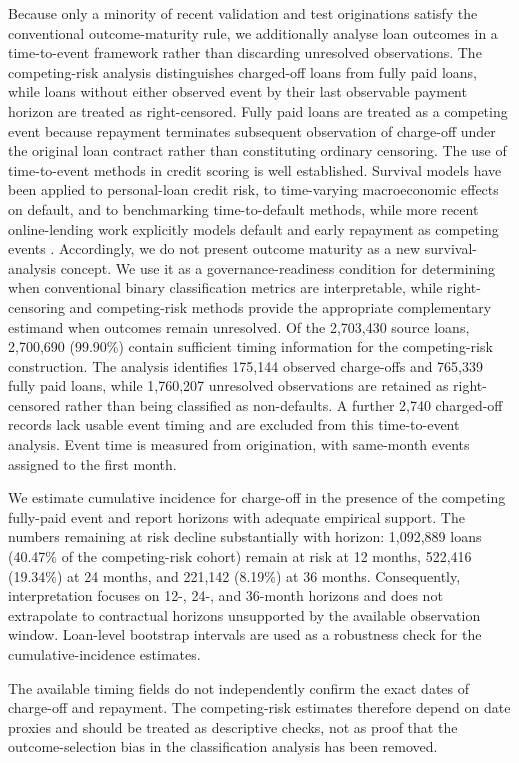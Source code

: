 \documentclass[10pt]{article}
\begin{document}
Because only a minority of recent validation and test originations satisfy the conventional outcome-maturity rule, we additionally analyse loan outcomes in a time-to-event framework rather than discarding unresolved observations. The competing-risk analysis distinguishes charged-off loans from fully paid loans, while loans without either observed event by their last observable payment horizon are treated as right-censored. Fully paid loans are treated as a competing event because repayment terminates subsequent observation of charge-off under the original loan contract rather than constituting ordinary censoring. The use of time-to-event methods in credit scoring is well established. Survival models have been applied to personal-loan credit risk, to time-varying macroeconomic effects on default, and to benchmarking time-to-default methods, while more recent online-lending work explicitly models default and early repayment as competing events \cite{ref49,ref50,ref51,ref52}. Accordingly, we do not present outcome maturity as a new survival-analysis concept. We use it as a governance-readiness condition for determining when conventional binary classification metrics are interpretable, while right-censoring and competing-risk methods provide the appropriate complementary estimand when outcomes remain unresolved. Of the 2,703,430 source loans, 2,700,690 (99.90\%) contain sufficient timing information for the competing-risk construction. The analysis identifies 175,144 observed charge-offs and 765,339 fully paid loans, while 1,760,207 unresolved observations are retained as right-censored rather than being classified as non-defaults. A further 2,740 charged-off records lack usable event timing and are excluded from this time-to-event analysis. Event time is measured from origination, with same-month events assigned to the first month.

We estimate cumulative incidence for charge-off in the presence of the competing fully-paid event and report horizons with adequate empirical support. The numbers remaining at risk decline substantially with horizon: 1,092,889 loans (40.47\% of the competing-risk cohort) remain at risk at 12 months, 522,416 (19.34\%) at 24 months, and 221,142 (8.19\%) at 36 months. Consequently, interpretation focuses on 12-, 24-, and 36-month horizons and does not extrapolate to contractual horizons unsupported by the available observation window. Loan-level bootstrap intervals are used as a robustness check for the cumulative-incidence estimates.

The available timing fields do not independently confirm the exact dates of charge-off and repayment. The competing-risk estimates therefore depend on date proxies and should be treated as descriptive checks, not as proof that the outcome-selection bias in the classification analysis has been removed.
\end{document}
